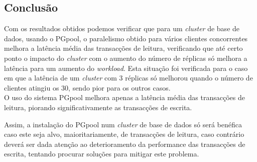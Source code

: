 \subsection{Conclusão}
Com os resultados obtidos podemos verificar que para um \textit{cluster} de base de dados, usando o PGpool, o paralelismo obtido para vários clientes concorrentes melhora a latência média das transacções de leitura, verificando que até certo ponto o impacto do \textit{cluster} com o aumento do número de réplicas só melhora a latência para um aumento do \textit{workload}. Esta situação foi verificada para o caso em que a latência de um \textit{cluster} com 3 réplicas só melhorou quando o número de clientes atingiu os 30, sendo pior para os outros casos. \\

O uso do sistema PGpool melhora apenas a latência média das transacções de leitura, piorando significativamente as transacções de escrita. 

Assim, a instalação do PGpool num \textit{cluster} de base de dados só será benéfica caso este seja alvo, maioritariamente, de transacções de leitura, caso contrário deverá ser dada atenção ao deterioramento da performance das transacções de escrita, tentando procurar soluções para mitigar este problema.